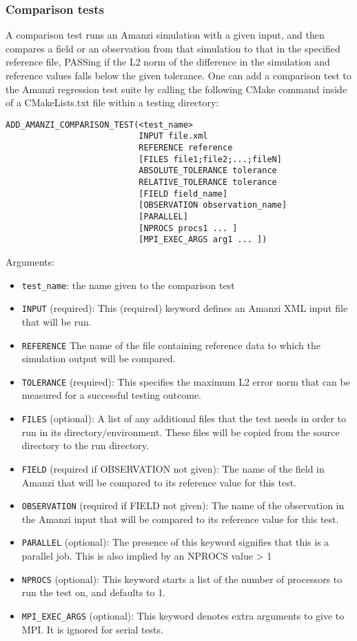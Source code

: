 \subsubsection{Comparison tests}

A comparison test runs an Amanzi simulation with a given input, and then compares 
a field or an observation from that simulation to that in the specified reference 
file, PASSing if the L2 norm of the difference in the simulation and reference 
values falls below the given tolerance. One can add a comparison test to the 
Amanzi regression test suite by calling the following CMake command inside of a 
CMakeLists.txt file within a testing directory:

\begin{lstlisting}
ADD_AMANZI_COMPARISON_TEST(<test_name> 
                           INPUT file.xml
                           REFERENCE reference
                           [FILES file1;file2;...;fileN]
                           ABSOLUTE_TOLERANCE tolerance
                           RELATIVE_TOLERANCE tolerance
                           [FIELD field_name]
                           [OBSERVATION observation_name]
                           [PARALLEL] 
                           [NPROCS procs1 ... ]
                           [MPI_EXEC_ARGS arg1 ... ])
\end{lstlisting}

Arguments:
\begin{itemize}
\item \verb|test_name|: the name given to the comparison test 
\item \verb|INPUT| (required): This (required) keyword defines an Amanzi XML input file that will 
      be run.
\item \verb|REFERENCE| The name of the file containing reference data to which 
      the simulation output will be compared.
\item \verb|TOLERANCE| (required): This specifies the maximum L2 error norm that can be 
      measured for a successful testing outcome.
\item \verb|FILES| (optional): A list of any additional files that the test needs in order 
      to run in its directory/environment. These files will be copied from the source 
      directory to the run directory.
\item \verb|FIELD| (required if OBSERVATION not given): The name of the field in Amanzi that 
      will be compared to its reference value for this test.
\item \verb|OBSERVATION| (required if FIELD not given): The name of the observation in the Amanzi 
      input that will be compared to its reference value for this test.
\item \verb|PARALLEL| (optional): The presence of this keyword signifies that this is 
      a parallel job. This is also implied by an NPROCS value > 1
\item \verb|NPROCS| (optional): This keyword starts a list of the number of processors to
      run the test on, and defaults to 1.
\item \verb|MPI_EXEC_ARGS| (optional): This keyword denotes extra arguments to give to
      MPI. It is ignored for serial tests.
\end{itemize}

